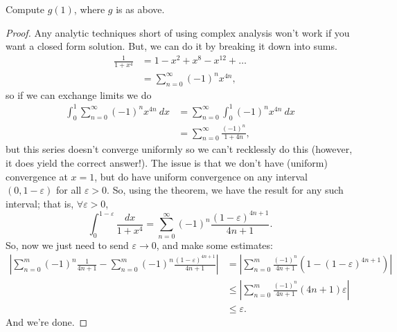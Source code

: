 \documentclass{notes}
\begin{document}
\begin{example}
  Compute $g(1)$, where $g$ is as above.
\end{example}
\begin{proof}
  Any analytic techniques short of using complex analysis won't work if you want a closed form
  solution. But, we can do it by breaking it down into sums.
  \begin{align*}
    \frac{1}{1 + x^4} &= 1 - x^2 + x^8 - x^{12} + \dots \\
                      &= \sum_{n=0}^\infty (-1)^n x^{4n},
  \end{align*}
  so if we can exchange limits we do
  \begin{align*}
    \int_0^1 \sum_{n=0}^\infty (-1)^n x^{4n}\ dx &= \sum_{n=0}^\infty \int_0^1 (-1)^n x^{4n}\ dx \\
                                                 &= \sum_{n=0}^\infty \frac{(-1)^n}{1 + 4n},
  \end{align*}
  but this series doesn't converge uniformly so we can't recklessly do this (however, it does yield
  the correct answer!). The issue is that we don't have (uniform) convergence at $x = 1$, but do
  have uniform convergence on any interval $(0, 1-\varepsilon)$ for all $\varepsilon > 0$. So, using
  the theorem, we have the result for any such interval; that is, $\forall \varepsilon > 0$, 
  $$\int_0^{1-\varepsilon} \frac{dx}{1 + x^4} = \sum_{n=0}^\infty (-1)^n \frac{(1 - \varepsilon)^{4n
  + 1}}{4n + 1}.$$  So, now we just need to send $\varepsilon\to 0$, and make some estimates:
  \begin{align*}
    \left| \sum_{n=0}^m (-1)^n \frac{1}{4n + 1} - \sum_{n=0}^m (-1)^n
    \frac{(1-\varepsilon)^{4n+1}}{4n + 1} \right| &= \left| \sum_{n=0}^m \frac{(-1)^n}{4n+1}\left( 1
  - (1-\varepsilon)^{4n+1}\right) \right| \\
  &\leq \left| \sum_{n=0}^m \frac{(-1)^n}{4n+1}(4n+1)\varepsilon \right| \\
  &\leq \varepsilon.
  \end{align*}
  And we're done.
\end{proof}

\end{document}
